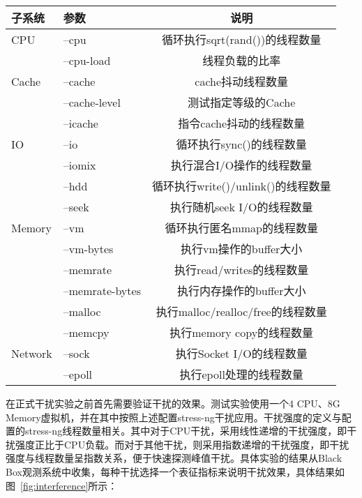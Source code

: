 \begin{table}[H]
    \centering
    \footnotesize%
    \setlength{\tabcolsep}{20pt}%
    \renewcommand{\arraystretch}{1.25}%
    \label{tab:arg_list}
    \begin{tabular}{llc}
        \hline
        子系统 & 参数 & 说明\\
        \hline
        CPU	    & --cpu & 循环执行sqrt(rand())的线程数量\\
	            & --cpu-load & 线程负载的比率\\
        Cache	& --cache & cache抖动线程数量\\
	            & --cache-level	&测试指定等级的Cache\\
	            & --icache	&指令cache抖动的线程数量\\
        IO	    & --io	&循环执行sync()的线程数量\\
	            & --iomix	&执行混合I/O操作的线程数量\\
	            & --hdd	&循环执行write()/unlink()的线程数量\\
	            & --seek	&执行随机seek I/O的线程数量\\
        Memory	& --vm	&循环执行匿名mmap的线程数量\\
	            & --vm-bytes	&执行vm操作的buffer大小\\
	            & --memrate	&执行read/writes的线程数量\\
	            & --memrate-bytes	&执行内存操作的buffer大小\\
	            & --malloc	&执行malloc/realloc/free的线程数量\\
	            & --memcpy	&执行memory copy的线程数量\\
        Network	& --sock	&执行Socket I/O的线程数量\\
	            & --epoll	&执行epoll处理的线程数量\\
        \hline
    \end{tabular}
\end{table}

在正式干扰实验之前首先需要验证干扰的效果。测试实验使用一个4 CPU、8G Memory虚拟机，并在其中按照上述配置stress-ng干扰应用。干扰强度的定义与配置的stress-ng线程数量相关。其中对于CPU干扰，采用线性递增的干扰强度，即干扰强度正比于CPU负载。而对于其他干扰，则采用指数递增的干扰强度，即干扰强度与线程数量呈指数关系，便于快速探测峰值干扰。具体实验的结果从Black Box观测系统中收集，每种干扰选择一个表征指标来说明干扰效果，具体结果如图~\ref{fig:interference}所示：

